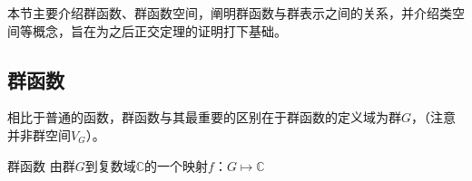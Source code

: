 
\begin{issues}
\issueDraft
\issueTODO
\end{issues}

本节主要介绍群函数、群函数空间，阐明群函数与群表示之间的关系，并介绍类空间等概念，旨在为之后正交定理的证明打下基础。

\subsection{群函数}

相比于普通的函数，群函数与其最重要的区别在于群函数的定义域为群$G$，（注意并非群空间$V_G$）。
\begin{definition}{群函数}
由群$G$到复数域$\mathbb{C}$的一个映射$f$：$G\longmapsto \mathbb{C}$
\end{definition}
